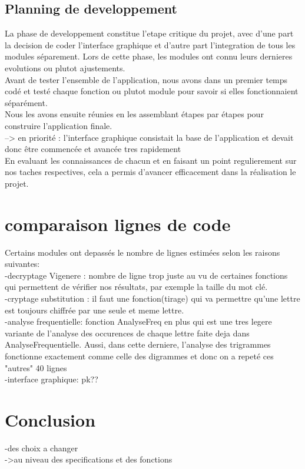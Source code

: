 \documentclass[a4]{article}
\begin{document}
		\subsection{Planning de developpement}
		La phase de developpement constitue l’etape critique du projet, avec d’une part la decision de coder l’interface graphique
et d’autre part l’integration de tous les modules séparement. Lors de cette phase, les modules ont connu leurs dernieres evolutions ou plutot ajustements. \\
Avant de tester l’ensemble de l’application, nous avons dans un premier temps codé et
testé chaque fonction ou plutot module pour savoir si elles fonctionnaient séparément. \\
Nous les avons ensuite
réunies en les assemblant étapes par étapes pour construire l’application finale.  \\
--> en priorité : l'interface graphique consistait la base de l'application et devait donc être commencée et avancée tres rapidement \\
En evaluant les connaissances de chacun et en faisant un point regulierement sur nos taches respectives, cela a permis 
d'avancer efficacement dans la réalisation le projet.
	\section{comparaison lignes de code}
		Certains modules ont depassés le nombre de lignes estimées selon les raisons suivantes: \\
		-decryptage Vigenere : nombre de ligne trop juste au vu de certaines fonctions qui permettent de vérifier
		 nos résultats, par exemple la taille du mot clé. \\
		-cryptage substitution : il faut une fonction(tirage) qui va permettre qu'une lettre est toujours chiffrée
		 par une seule et meme lettre. \\
		-analyse frequentielle: fonction AnalyseFreq en plus qui est une tres legere variante de l'analyse des occurences de 
		chaque lettre faite deja dans AnalyseFrequentielle. Aussi, dans cette derniere, l'analyse des trigrammes fonctionne exactement
		comme celle des digrammes et donc on a repeté ces "autres" 40 lignes \\
		-interface graphique: pk??
		
	
	\section{Conclusion}
	-des choix a changer \\
	->au niveau des specifications et des fonctions \\ \\
	
\end{document}
